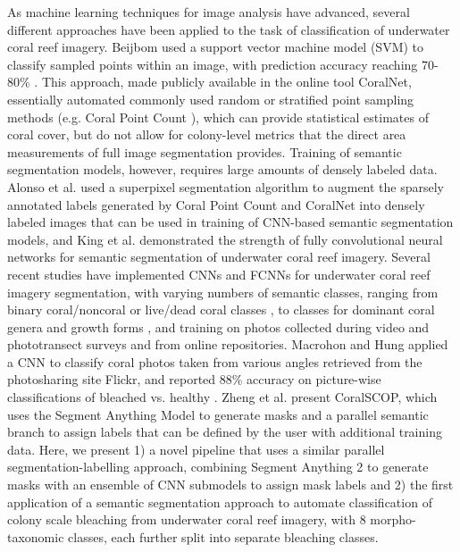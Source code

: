 \documentclass[11pt]{elsarticle}
\begin{document}
As machine learning techniques for image analysis have advanced, several different approaches have been applied to the task of classification of underwater coral reef imagery. Beijbom used a support vector machine model (SVM) to classify sampled points within an image, with prediction accuracy reaching 70-80\% \citep{beijbom2012}. This approach, made publicly available in the online tool CoralNet, essentially automated commonly used random or stratified point sampling methods (e.g. Coral Point Count \citep{kohlergill2006}), which can provide statistical estimates of coral cover, but do not allow for colony-level metrics that the direct area measurements of full image segmentation provides. Training of semantic segmentation models, however, requires large amounts of densely labeled data. Alonso et al. \citep{alonso2017,alonso2019} used a superpixel segmentation algorithm to augment the sparsely annotated labels generated by Coral Point Count and CoralNet into densely labeled images that can be used in training of CNN-based semantic segmentation models, and King et al. \citep{king2018} demonstrated the strength of fully convolutional neural networks for semantic segmentation of underwater coral reef imagery. Several recent studies have implemented CNNs and FCNNs for underwater coral reef imagery segmentation, with varying numbers of semantic classes, ranging from binary coral/noncoral or live/dead coral classes \citep{zhang2022, kopecky2023}, to classes for dominant coral genera and growth forms  \citep{zhang2024, li2024, lawson2025, zheng2025}, and training on photos collected during video and phototransect surveys and from online repositories. Macrohon and Hung applied a CNN to classify coral photos taken from various angles retrieved from the photosharing site Flickr, and reported 88\% accuracy on picture-wise classifications of bleached vs. healthy \citep{macrohonhung2025}. Zheng et al. \citep{zheng2024} present CoralSCOP, which uses the Segment Anything Model \citep{kirillov2023segment} to generate masks and a parallel semantic branch to assign labels that can be defined by the user with additional training data. Here, we present 1) a novel pipeline that uses a similar parallel segmentation-labelling approach, combining Segment Anything 2 to generate masks with an ensemble of CNN submodels to assign mask labels and 2) the first application of a semantic segmentation approach to automate classification of colony scale bleaching from underwater coral reef imagery, with 8 morpho-taxonomic classes, each further split into separate bleaching classes.
\end{document}
